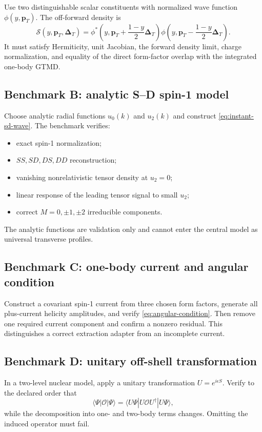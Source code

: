 \documentclass[11pt]{article}
\newcommand{\pT}{\bm{p}_{T}}
\newcommand{\DT}{\bm{\Delta}_{T}}
\newcommand{\cO}{\mathcal O}
\newcommand{\cS}{\mathcal S}
\begin{document}
Use two distinguishable scalar constituents with normalized wave function
\(\phi(y,\pT)\).  The off-forward density is
\begin{equation}
 \cS(y,\pT,\DT)
 =\phi^*\!\left(y,\pT+\frac{1-y}{2}\DT\right)
 \phi\!\left(y,\pT-\frac{1-y}{2}\DT\right).
\label{eq:benchmark-scalar-density}
\end{equation}
It must satisfy Hermiticity, unit Jacobian, the forward density limit, charge
normalization, and equality of the direct form-factor overlap with the
integrated one-body GTMD.

\subsection{Benchmark B: analytic S--D spin-1 model}

Choose analytic radial functions \(u_0(k)\) and \(u_2(k)\) and construct
\cref{eq:instant-sd-wave}.  The benchmark verifies:
\begin{itemize}
\item exact spin-1 normalization;
\item \(SS,SD,DS,DD\) reconstruction;
\item vanishing nonrelativistic tensor density at \(u_2=0\);
\item linear response of the leading tensor signal to small \(u_2\);
\item correct \(M=0,\pm1,\pm2\) irreducible components.
\end{itemize}
The analytic functions are validation only and cannot enter the central
model as universal transverse profiles.

\subsection{Benchmark C: one-body current and angular condition}

Construct a covariant spin-1 current from three chosen form factors, generate
all plus-current helicity amplitudes, and verify
\cref{eq:angular-condition}.  Then remove one required current component and
confirm a nonzero residual.  This distinguishes a correct extraction
adapter from an incomplete current.

\subsection{Benchmark D: unitary off-shell transformation}

In a two-level nuclear model, apply a unitary transformation
\(U=e^{i\epsilon S}\).  Verify to the declared order that
\begin{equation}
 \langle\Psi|\cO|\Psi\rangle
 =\langle U\Psi|U\cO U^\dagger|U\Psi\rangle,
\label{eq:benchmark-unitary-invariance}
\end{equation}
while the decomposition into one- and two-body terms changes.  Omitting the
induced operator must fail.
\end{document}
